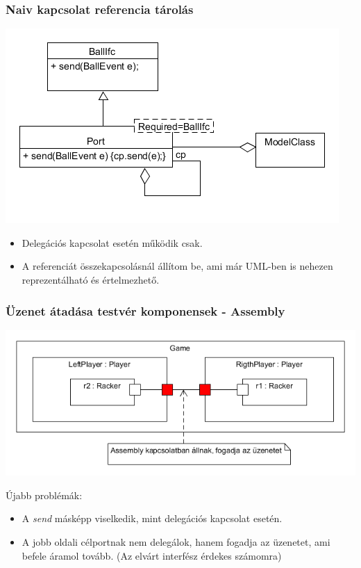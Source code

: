 \documentclass[11pt]{beamer}
\begin{document}
\begin{frame}
	\frametitle{Naiv kapcsolat referencia tárolás}
	\begin{center}
	\includegraphics[scale=0.5]{vedes_demo_delegref.png}
	\end{center}
	\begin{itemize}
	\item Delegációs kapcsolat esetén működik csak.
	\item A referenciát összekapcsolásnál állítom be, ami már UML-ben is nehezen reprezentálható és értelmezhető.	
	\end{itemize}

\end{frame}


\begin{frame}
	\frametitle{Üzenet átadása testvér komponensek - Assembly}
	\begin{center}
	\includegraphics[scale=0.5]{vedes_demo_assconnect.png}
	\end{center}
	Újabb problémák:
	\begin{itemize}
	\item A \textit{send} másképp viselkedik, mint delegációs kapcsolat esetén.
	\item A jobb oldali célportnak nem delegálok, hanem fogadja az üzenetet, ami befele áramol tovább. (Az elvárt interfész érdekes számomra)
	\end{itemize}
		
\end{frame}
\end{document}
